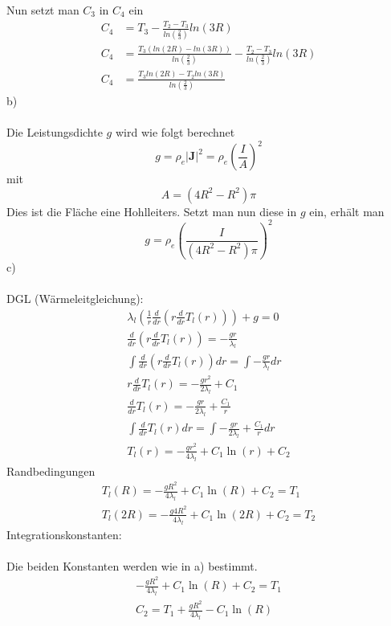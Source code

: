 Nun setzt man $C_3$ in $C_4$ ein
\begin{align*}
	C_4 &= T_3 -  \frac{T_2 - T_3}{ln\left( \frac{2}{3}\right)} ln\left( 3R\right) \\
	C_4 &= \frac{T_3 \left( ln\left( 2R\right) - ln\left( 3R\right) \right)}{ln\left( \frac{2}{3}\right)} - \frac{T_2 - T_3}{ln\left( \frac{2}{3}\right)} ln\left( 3R\right) \\
	C_4 &= \frac{T_3 ln\left( 2R \right) - T_2 ln\left( 3R\right)}{ln\left( \frac{2}{3}\right)}
\end{align*}
b) \\ \\	
Die Leistungsdichte $g$ wird wie folgt berechnet
\[
	g = \rho_e |\textbf{J}|^2 = \rho_e \left( \frac{I}{A}\right)^2
\]
mit
\[
	A = \left(4R^2 - R^2\right)\pi
\]
Dies ist die Fläche eine Hohlleiters. Setzt man nun diese in $g$ ein, erhält man
\[
	g = \rho_e \left( \frac{I}{\left(4R^2 - R^2\right)\pi}\right)^2
\]
c) \\ \\
DGL (Wärmeleitgleichung):
\begin{align*}
	\lambda_l \left( \frac{1}{r}\frac{d}{dr}\left( r\frac{d}{dr} T_l\left(r\right)\right)\right) + g = 0 \\
	\frac{d}{dr}\left( r\frac{d}{dr} T_l\left(r\right)\right) = -\frac{gr}{\lambda_l} \\
	\int \frac{d}{dr}\left( r\frac{d}{dr} T_l\left(r\right)\right) dr = \int -\frac{gr}{\lambda_l} dr \\
	 r\frac{d}{dr} T_l\left(r\right) = -\frac{gr^2}{2\lambda_l} + C_1 \\
	 \frac{d}{dr} T_l\left(r\right) = -\frac{gr}{2\lambda_l} + \frac{C_1}{r} \\
	 \int \frac{d}{dr} T_l\left(r\right) dr = \int -\frac{gr}{2\lambda_l} + \frac{C_1}{r} dr \\
	 T_l\left(r\right) = -\frac{gr^2}{4\lambda_l} + C_1\ln\left( r \right) + C_2
\end{align*}
Randbedingungen
\begin{align*}
	T_l\left(R\right) = -\frac{gR^2}{4\lambda_l} + C_1\ln\left(R\right) + C_2 = T_1 \\
	T_l\left(2R\right) = -\frac{g4R^2}{4\lambda_l} + C_1 \ln\left(2R\right) + C_2 = T_2
\end{align*}
\newpage
\noindent
Integrationskonstanten: \\ \\
Die beiden Konstanten werden wie in a) bestimmt.
\begin{align*}
	-\frac{gR^2}{4\lambda_l} + C_1\ln\left(R\right) + C_2 = T_1 \\
	C_2 = T_1 + \frac{gR^2}{4\lambda_l} - C_1\ln\left(R\right)
\end{align*}
